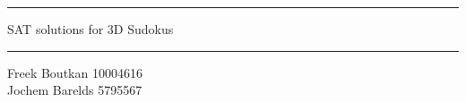 \documentclass{article}
\begin{document}
	

\begin{center}
\rule{\textwidth}{.4pt}
\Large{SAT solutions for 3D Sudokus\\\vspace{.2cm}}
\rule{\textwidth}{.8pt}

\small{Freek Boutkan 10004616\\Jochem Barelds 5795567}
\end{center}

















\printbibliography
\end{document}
